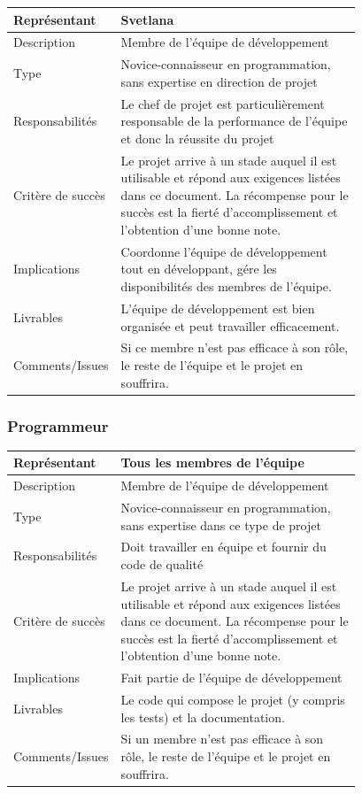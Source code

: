 \documentclass[11pt]{article}
\begin{document}
\begin{tabular}{|a|L{0.78\linewidth}|}
	\hline
	Représentant & Svetlana \\
	\hline
	Description & Membre de l'équipe de développement \\
	\hline
	Type & Novice-connaisseur en programmation, sans expertise en direction de projet \\
	\hline
	Responsabilités & Le chef de projet est particulièrement responsable de la performance de l'équipe et donc la réussite du projet \\
	\hline
	Critère de succès & Le projet arrive à un stade auquel il est utilisable et répond aux exigences listées dans ce document. La récompense pour le succès est la fierté d'accomplissement et l'obtention d'une bonne note. \\
	\hline
	Implications & Coordonne l’équipe de développement tout en développant, gére les disponibilités des membres de l’équipe. \\
	\hline
	Livrables & L'équipe de développement est bien organisée et peut travailler efficacement. \\
	\hline
	Comments/Issues & Si ce membre n'est pas efficace à son rôle, le reste de l'équipe et le projet en souffrira. \\
	\hline
\end{tabular}

\subsubsection{Programmeur}

\begin{tabular}{|a|L{0.78\linewidth}|}
\hline
Représentant & Tous les membres de l'équipe \\
\hline
Description & Membre de l'équipe de développement \\
\hline
Type & Novice-connaisseur en programmation, sans expertise dans ce type de projet \\
\hline
Responsabilités & Doit travailler en équipe et fournir du code de qualité \\
\hline
Critère de succès & Le projet arrive à un stade auquel il est utilisable et répond aux exigences listées dans ce document. La récompense pour le succès est la fierté d'accomplissement et l'obtention d'une bonne note. \\
\hline
Implications & Fait partie de l'équipe de développement \\
\hline
Livrables & Le code qui compose le projet (y compris les tests) et la documentation. \\
\hline
Comments/Issues & Si un membre n'est pas efficace à son rôle, le reste de l'équipe et le projet en souffrira. \\
\hline
\end{tabular}
\end{document}
